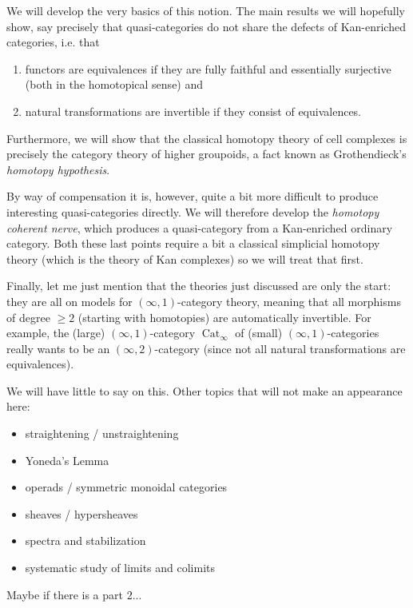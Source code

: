     We will develop the very basics of this notion. The main results we will hopefully show, say precisely that quasi-categories do not share the defects of Kan-enriched categories, i.e. that
    \begin{enumerate}[label=\arabic*)]
        \item functors are equivalences if they are fully faithful and essentially surjective (both in the homotopical sense) and
        \item natural transformations are invertible if they consist of equivalences.
    \end{enumerate}
    Furthermore, we will show that the classical homotopy theory of cell complexes is precisely the category theory of higher groupoids, a fact known as Grothendieck's \emph{homotopy hypothesis}.
    
    By way of compensation it is, however, quite a bit more difficult to produce interesting quasi-categories directly. We will therefore develop the \emph{homotopy coherent nerve}, which produces a quasi-category from a Kan-enriched ordinary category. Both these last points require a bit a classical simplicial homotopy theory (which is the theory of Kan complexes) so we will treat that first.
    
    Finally, let me just mention that the theories just discussed are only the start: they are all on models for $(\infty, 1)$-category theory, meaning that all morphisms of degree $\geq 2$ (starting with homotopies) are automatically invertible. For example, the (large) $(\infty, 1)$-category $\operatorname{Cat}_{\infty}$ of (small) $(\infty, 1)$-categories really wants to be an $(\infty, 2)$-category (since not all natural transformations are equivalences).
    
    We will have little to say on this. Other topics that will not make an appearance here:
    \begin{itemize}[label=$-$]
        \item straightening / unstraightening
        \item Yoneda's Lemma
        \item operads / symmetric monoidal categories
        \item sheaves / hypersheaves
        \item spectra and stabilization
        \item systematic study of limits and colimits
    \end{itemize}

    Maybe if there is a part 2...